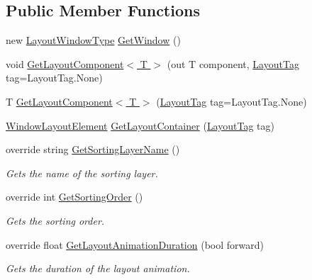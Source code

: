 \subsection*{Public Member Functions}
\begin{DoxyCompactItemize}
\item 
new \hyperlink{class_unity_engine_1_1_u_i_1_1_windows_1_1_types_1_1_layout_window_type}{Layout\+Window\+Type} \hyperlink{class_unity_engine_1_1_u_i_1_1_windows_1_1_types_1_1_layout_window_type_a1b22ee700b36ea6993c75069b6b2fdc4}{Get\+Window} ()
\item 
void \hyperlink{class_unity_engine_1_1_u_i_1_1_windows_1_1_types_1_1_layout_window_type_a1f315562f30681384f114323427259dd}{Get\+Layout\+Component$<$ T $>$} (out T component, \hyperlink{namespace_unity_engine_1_1_u_i_1_1_windows_a954ff5db0de6295464f3b95598158333}{Layout\+Tag} tag=Layout\+Tag.\+None)
\item 
T \hyperlink{class_unity_engine_1_1_u_i_1_1_windows_1_1_types_1_1_layout_window_type_a703c84dc42ae6fd3deccd6432fff6b1e}{Get\+Layout\+Component$<$ T $>$} (\hyperlink{namespace_unity_engine_1_1_u_i_1_1_windows_a954ff5db0de6295464f3b95598158333}{Layout\+Tag} tag=Layout\+Tag.\+None)
\item 
\hyperlink{class_unity_engine_1_1_u_i_1_1_windows_1_1_window_layout_element}{Window\+Layout\+Element} \hyperlink{class_unity_engine_1_1_u_i_1_1_windows_1_1_types_1_1_layout_window_type_a2524c4add1a09f525370bda4e0b7336f}{Get\+Layout\+Container} (\hyperlink{namespace_unity_engine_1_1_u_i_1_1_windows_a954ff5db0de6295464f3b95598158333}{Layout\+Tag} tag)
\item 
override string \hyperlink{class_unity_engine_1_1_u_i_1_1_windows_1_1_types_1_1_layout_window_type_a9c6e229390ee7210532d9a0a4cf17664}{Get\+Sorting\+Layer\+Name} ()
\begin{DoxyCompactList}\small\item\em Gets the name of the sorting layer. \end{DoxyCompactList}\item 
override int \hyperlink{class_unity_engine_1_1_u_i_1_1_windows_1_1_types_1_1_layout_window_type_a7bf7a76e67c3d4b2aafb144595c7baeb}{Get\+Sorting\+Order} ()
\begin{DoxyCompactList}\small\item\em Gets the sorting order. \end{DoxyCompactList}\item 
override float \hyperlink{class_unity_engine_1_1_u_i_1_1_windows_1_1_types_1_1_layout_window_type_a9e3c2e951162462c333a9d936e39bd23}{Get\+Layout\+Animation\+Duration} (bool forward)
\begin{DoxyCompactList}\small\item\em Gets the duration of the layout animation. \end{DoxyCompactList}\end{DoxyCompactItemize}
